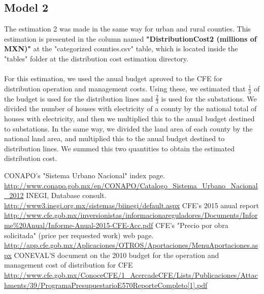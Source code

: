 \documentclass[•]{article}
\begin{document}
\subsection*{Model 2}
The estimation 2 was made in the same way for urban and rural counties. This estimation is presented in the column named \textbf{"DistributionCost2 (millions of MXN)"} at the "categorized counties.csv" table, which is located inside the "tables" folder at the distribution cost estimation directory.
\\
\\For this estimation, we used the anual budget aproved to the CFE for distribution operation and management costs\cite{cfe3}. Using these, we estimated that $\frac{1}{3}$ of the budget is used for the distribution lines and $\frac{2}{3}$ is used for the substations. We divided the number of houses with electricity of a county by the national total of houses with electricity, and then we multiplied this to the anual budget destined to substations. In the same way, we divided the land area of each county by the national land area, and multiplied this to the anual budget destined to distribution lines. We summed this two quantities to obtain the estimated distribution cost.



\begin{thebibliography}{9}

CONAPO's "Sistema Urbano Nacional" index page. \url{http://www.conapo.gob.mx/en/CONAPO/Catalogo_Sistema_Urbano_Nacional_2012}
INEGI, Database consult. \url{http://www3.inegi.org.mx/sistemas/biinegi/default.aspx}
CFE's 2015 anual report \url{http://www.cfe.gob.mx/inversionistas/informacionareguladores/Documents/Informe%20Anual/Informe-Anual-2015-CFE-Acc.pdf}
CFE's "Precio por obra solicitada" (price per requested work) web page. \url{http://app.cfe.gob.mx/Aplicaciones/OTROS/Aportaciones/MenuAportaciones.aspx}
CONEVAL'S document on the 2010 budget for the operation and management cost of distribution for CFE \url{http://www.cfe.gob.mx/ConoceCFE/1_AcercadeCFE/Lists/Publicaciones/Attachments/39/ProgramaPresupuestarioE570ReporteCompleto[1].pdf}
\end{thebibliography}
\end{document}
